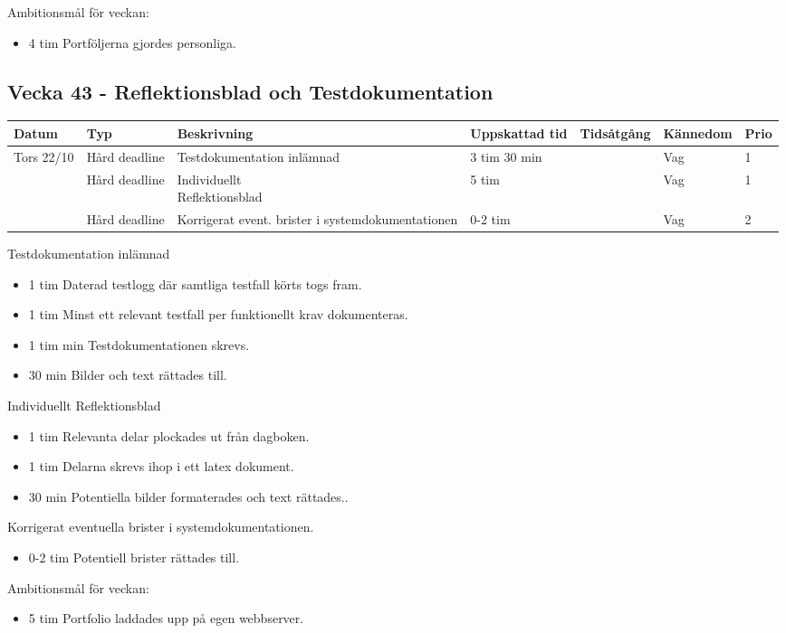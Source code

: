 \documentclass{TDP003mall}
\begin{document}
Ambitionsmål för veckan:
\begin{itemize}
\item 4 tim Portföljerna gjordes personliga.
\end{itemize}

\newpage

\subsection*{Vecka 43 - Reflektionsblad och Testdokumentation}
\begin{tabularx}{\linewidth}{|l|l|X|l|l|l|l|}
  \hline
  Datum      & Typ           & Beskrivning                                       & Uppskattad tid & Tidsåtgång & Kännedom & Prio \\ [0.5ex]
  \hline                                                                             
  Tors 22/10 & Hård deadline & Testdokumentation inlämnad                        & 3 tim 30 min   &            & Vag      & 1\\
  \hline                                                                             
             & Hård deadline & \makecell[tl]{Individuellt \\ Reflektionsblad}    & 5 tim          &            & Vag      & 1\\
  \hline                                                                             
             & Hård deadline & Korrigerat event. brister i systemdokumentationen & 0-2 tim        &            & Vag      & 2 \\
  \hline
\end{tabularx}

Testdokumentation inlämnad
\begin{itemize}
  \item 1 tim Daterad testlogg där samtliga testfall körts togs fram.
  \item 1 tim Minst ett relevant testfall per funktionellt krav dokumenteras.
  \item 1 tim min Testdokumentationen skrevs.
  \item 30 min Bilder och text rättades till.
\end{itemize}

Individuellt Reflektionsblad
\begin{itemize}
\item 1 tim Relevanta delar plockades ut från dagboken.
  \item 1 tim Delarna skrevs ihop i ett latex dokument.
  \item 30 min Potentiella bilder formaterades och text rättades..
\end{itemize}
  
  Korrigerat eventuella brister i systemdokumentationen.
\begin{itemize}
  \item 0-2 tim Potentiell brister rättades till.
\end{itemize}

Ambitionsmål för veckan:
\begin{itemize}
  \item 5 tim Portfolio laddades upp på egen webbserver.
\end{itemize}
\end{document}
